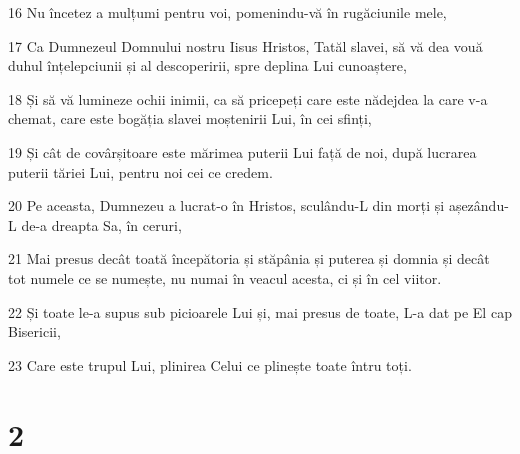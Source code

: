 \par 16 Nu încetez a mulțumi pentru voi, pomenindu-vă în rugăciunile mele,
\par 17 Ca Dumnezeul Domnului nostru Iisus Hristos, Tatăl slavei, să vă dea vouă duhul înțelepciunii și al descoperirii, spre deplina Lui cunoaștere,
\par 18 Și să vă lumineze ochii inimii, ca să pricepeți care este nădejdea la care v-a chemat, care este bogăția slavei moștenirii Lui, în cei sfinți,
\par 19 Și cât de covârșitoare este mărimea puterii Lui față de noi, după lucrarea puterii tăriei Lui, pentru noi cei ce credem.
\par 20 Pe aceasta, Dumnezeu a lucrat-o în Hristos, sculându-L din morți și așezându-L de-a dreapta Sa, în ceruri,
\par 21 Mai presus decât toată începătoria și stăpânia și puterea și domnia și decât tot numele ce se numește, nu numai în veacul acesta, ci și în cel viitor.
\par 22 Și toate le-a supus sub picioarele Lui și, mai presus de toate, L-a dat pe El cap Bisericii,
\par 23 Care este trupul Lui, plinirea Celui ce plinește toate întru toți.

\chapter{2}

